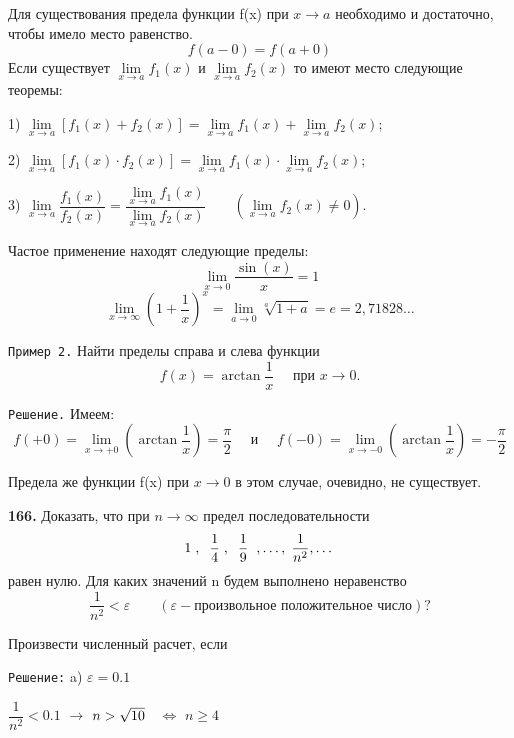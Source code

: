 \documentclass[12pt]{article}
\begin{document}
	Для существования предела функции f(x) при $x\longrightarrow a$ необходимо и достаточно, чтобы имело место равенство.
	\[
		f(a-0) = f(a+0)
	\]
	Если существует $\lim\limits_{x\to a} f_1(x)$ и $\lim\limits_{x\to a} f_2(x)$ то имеют место следующие теоремы: \vspace{2mm}
	
	1) $\lim\limits_{x\to a} [f_1(x)+f_2(x)] = \lim\limits_{x\to a} f_1(x)+\lim\limits_{x\to a}f_2(x);$\vspace{4mm}
	
	2) $\lim\limits_{x\to a}[f_1(x)\cdot f_2(x)] = \lim\limits_{x\to a}f_1(x)\cdot \lim\limits_{x\to a} f_2(x);$
	
	3) $\lim\limits_{x\to a}\dfrac{f_1(x)}{f_2(x)} = \dfrac{\lim\limits_{x\to a}f_1(x)}{\lim\limits_{x\to a} f_2(x)} \qquad (\lim\limits_{x\to a}f_2(x) \neq 0).$
	
	Частое применение находят следующие пределы:
	\[
		\lim\limits_{x\to 0}\dfrac{\sin(x)}{x} = 1
	\]
	\[
		\lim\limits_{x\to \infty} \left(1+\dfrac{1}{x}\right)^x = \lim\limits_{a\to 0} \sqrt[a]{1+a} = e = 2,71828\dots
	\]
	
	{\tt Пример 2.} Найти пределы справа и слева функции
	\[
		f(x) = \arctan\dfrac{1}{x}\quad\text{ при  } x\longrightarrow 0.
	\]
	
	{\tt Решение.} Имеем:
	\[
		f(+0) = \lim\limits_{x\to+0}\left(\arctan\dfrac{1}{x}\right) = \dfrac{\pi}{2} \quad\text{ и }\quad f(-0) = \lim\limits_{x\to-0} \left(\arctan\dfrac{1}{x}\right) =-\dfrac{\pi}{2}
	\]
	
	Предела же функции f(x) при $x\longrightarrow0$ в этом случае, очевидно, не существует.
	\medskip
	
	{\bf 166.} Доказать, что при $n\longrightarrow \infty$ предел последовательности
	\[
		1\hspace{1mm},\hspace{2mm}\dfrac{1}{4}\hspace{1mm},\hspace{2mm}\dfrac{1}{9}\hspace{2mm},\dots,\hspace{1mm}\dfrac{1}{n^2},\dots
	\]
	равен нулю. Для каких значений n будем выполнено неравенство
	\[
		\dfrac{1}{n^2} < \varepsilon \qquad (\varepsilon - \text{произвольное положительное число})?
	\]
	
	Произвести численный расчет, если 
	
	{\tt Решение:} a) $\varepsilon = 0.1$
	
	\qquad $\dfrac{1}{n^2} < 0.1$ $\longrightarrow$ $n>\sqrt{10} \hspace{2mm}$ $\Leftrightarrow$ $n\ge4$\medskip
	
\end{document}
